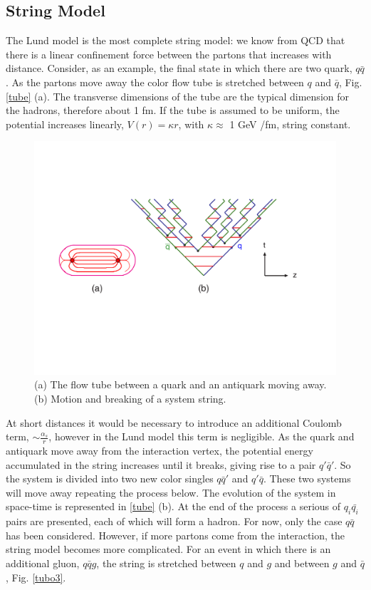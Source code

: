 \subsection*{String Model}
The Lund model is the most complete string model: we know from QCD that there is a linear confinement force between the partons that increases with distance. Consider, as an example, the final state in which there are two quark, $ q \bar{q} $. As the partons move away the color flow tube is stretched between $ q $ and $ \bar{q} $, Fig. \ref{tube} (a). The transverse dimensions of the tube are the typical dimension for the hadrons, therefore  about 1 fm.
If the tube is assumed to be uniform, the potential increases linearly, $ V (r) = \kappa r $, with $ \kappa \approx $ 1 GeV /fm, string constant.
\begin{figure}
\centering
\includegraphics[scale= 0.5]{../Cap3/Fig_MC/stringone}
\caption{(a) The flow tube between a quark and an antiquark moving away. (b) Motion and breaking of a system string.}
\label{tubo}
\end{figure}
At short distances it would be necessary to introduce an additional Coulomb term, $ \sim \frac{\alpha_s}{r} $, however in the Lund model this term is  negligible.
As the quark and antiquark move away from the interaction vertex, the potential energy accumulated in the string increases until it breaks, giving rise to a pair $ q'  \bar{q}' $. So the system is divided into two new color singles $ q \bar{q} '$ and $ q' \bar{q} $. These two systems will move away  repeating the process below. The evolution of the system in space-time is represented in \ref{tube} (b).
At the end of the process  a serious of  $ q_i \bar{q_i} $ pairs are presented, each of which will form a hadron.
For now, only the case $ q \bar{q} $ has been considered. However, if more partons come from the interaction, the string model becomes more complicated. For an event in which there is an additional gluon, $ q \bar{q} g $, the string is stretched between $ q $ and $ g $ and between $ g $ and $ \bar{q} $, Fig. \ref{tubo3}.


